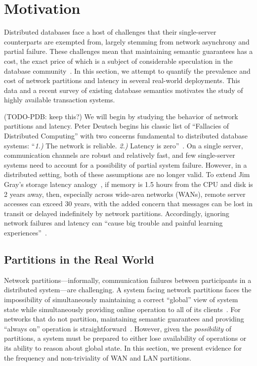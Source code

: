
\section{Motivation}
\label{sec:motivation}

Distributed databases face a host of challenges that their
single-server counterparts are exempted from, largely stemming from
network asynchrony and partial failure. These challenges mean that
maintaining semantic guarantees has a cost, the exact price of which
is a subject of considerable speculation in the database
community~\cite{stonebraker2010errors}. In this section, we attempt to
quantify the prevalence and cost of network partitions and latency in
several real-world deployments. This data and a recent survey of
existing database semantics motivates the study of highly available
transaction systems.

(TODO-PDB: keep this?) We will begin by studying the behavior of
network partitions and latency. Peter Deutsch begins his classic list
of ``Fallacies of Distributed Computing'' with two concerns
fundamental to distributed database systems: ``\textit{1.)}  The
network is reliable. \textit{2.)} Latency is
zero''~\cite{fallacies-deutsch}. On a single server, communication
channels are robust and relatively fast, and few single-server systems
need to account for a possibility of partial system failure. However,
in a distributed setting, both of these assumptions are no longer
valid. To extend Jim Gray's storage latency analogy~\cite{gray-rules},
if memory is 1.5 hours from the CPU and disk is 2 years away, then,
especially across wide-area networks (WANs), remote server accesses
can exceed 30 years, with the added concern that messages can be lost
in transit or delayed indefinitely by network partitions. Accordingly,
ignoring network failures and latency can ``cause big trouble and
painful learning experiences''~\cite{fallacies-deutsch}.

\subsection{Partitions in the Real World}

Network partitions---informally, communication failures between
participants in a distributed system---are challenging. A system
facing network partitions faces the impossibility of simultaneously
maintaining a correct ``global'' view of system state while
simultaneously providing online operation to all of its
clients~\cite{davidson-survey}. For networks that do not partition,
maintaining semantic guarantees and providing ``always on'' operation
is straightforward~\cite{stonebraker2010errors}. However, given the
\textit{possibility} of partitions, a system must be prepared to
either lose availability of operations or its ability to reason about
global state. In this section, we present evidence for the frequency
and non-triviality of WAN and LAN partitions.

